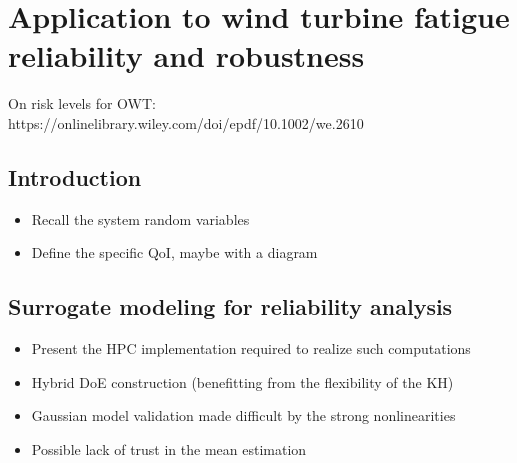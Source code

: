 \cleardoublepage
\chapter{Application to wind turbine fatigue reliability and robustness}
\label{chpt:7}
\hfill
\localtableofcontents
\newpage

On risk levels for OWT: https://onlinelibrary.wiley.com/doi/epdf/10.1002/we.2610


\section{Introduction}
\begin{itemize}
    \item Recall the system random variables
    \item Define the specific QoI, maybe with a diagram
\end{itemize}




\section{Surrogate modeling for reliability analysis}

\begin{itemize}
    \item Present the HPC implementation required to realize such computations
    \item Hybrid DoE construction (benefitting from the flexibility of the KH)
    \item Gaussian model validation made difficult by the strong nonlinearities
    \item Possible lack of trust in the mean estimation
\end{itemize}



